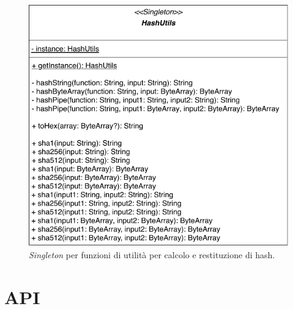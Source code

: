 	\begin{figure}
		\centering
		\includegraphics[scale=0.65]{figure/HashUtils.pdf}
		\caption{\textit{Singleton} per funzioni di utilità per calcolo e restituzione di hash.}\label{fig:hashUtils}
	\end{figure}

\section{API}

%	
%	

